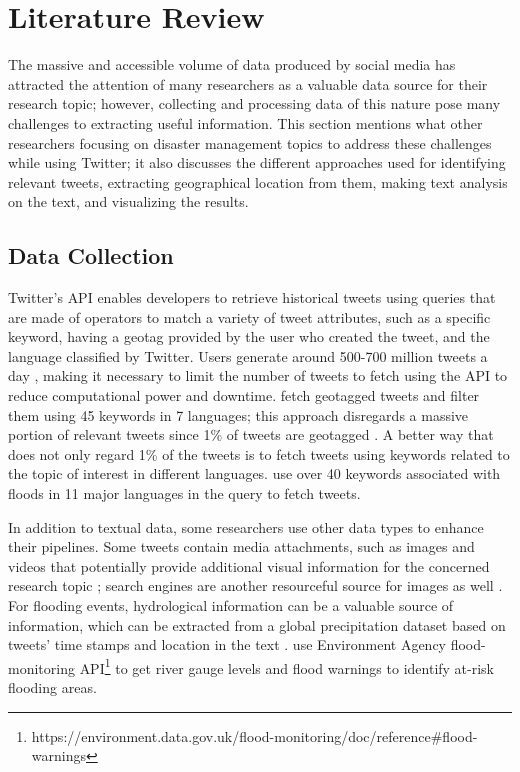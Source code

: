\chapter{Literature Review}

The massive and accessible volume of data produced by social media has attracted the attention of
many researchers as a valuable data source for their research topic; however, collecting and
processing data of this nature pose many challenges to extracting useful information. This section
mentions what other researchers focusing on disaster management topics to address these
challenges while using Twitter; it also discusses the different approaches used for identifying
relevant tweets, extracting geographical location from them, making text analysis on the text, and visualizing the results.

\section{Data Collection} 

Twitter's \ac{API} enables developers to retrieve historical tweets using queries that are made of
operators to match a variety of tweet attributes, such as a specific keyword, having a geotag
provided by the user who created the tweet, and the language classified by Twitter. Users generate
around 500-700 million tweets a day \cite{inproceedings}, making it necessary to limit the number of
tweets to fetch using the \ac{API} to reduce computational power and downtime.
 fetch geotagged tweets and filter them using 45 keywords
in 7 languages; this approach disregards a massive portion of relevant tweets since 1\% of tweets
are geotagged \cite{middletonRealTimeCrisisMapping2014}. A better way that does not only regard 1\%
of the tweets is to fetch tweets using keywords related to the topic of interest in different
languages.  use over 40 keywords associated with
floods in 11 major languages in the query to fetch tweets.

In addition to textual data, some researchers use other data types to enhance their pipelines. Some
tweets contain media attachments, such as images and videos that potentially provide additional
visual information for the concerned research topic
\cite{alamFloodDetectionTwitter2020}\cite{ningPrototypingSocialMedia2020}\cite{saidFloodsDetectionTwitter2020};
search engines are another resourceful source for images as well
\cite{fengExtractionPluvialFlood2018}. For flooding events, hydrological information can be a
valuable source of information, which can be extracted from a global precipitation dataset based on
tweets' time stamps and location in the text \cite{debruijnImprovingClassificationFlood2020}.
 use Environment Agency flood-monitoring
\ac{API}\footnote{https://environment.data.gov.uk/flood-monitoring/doc/reference\#flood-warnings} to
get river gauge levels and flood warnings to identify at-risk flooding areas.

